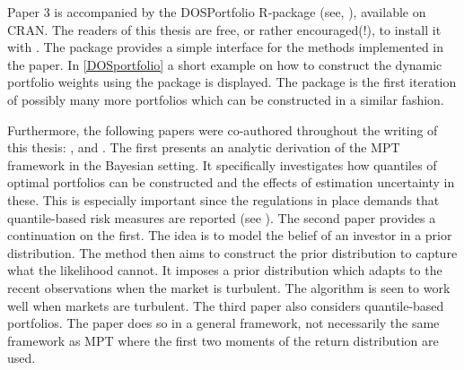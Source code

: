 \documentclass[12pt, oneside]{book}\usepackage{knitr}
\begin{document}
Paper 3 is accompanied by the DOSPortfolio R-package (see, \citet{DOSPortfolio}), available on CRAN. 
The readers of this thesis are free, or rather encouraged(!), to install it with \hlstd{(}\hlstd{)}. 
The package provides a simple interface for the methods implemented in the paper. 
In \ref{DOSportfolio} a short example on how to construct the dynamic portfolio weights using the package is displayed. 
The package is the first iteration of possibly many more portfolios which can be constructed in a similar fashion.
\begin{knitrout}\small
{}\color{fgcolor}
\end{knitrout}
Furthermore, the following papers were co-authored throughout the writing of this thesis: \cite{bodnar2020quantile}, \cite{bodnar2021bayesian}  and \cite{bodnar2021quantile}.
The first presents an analytic derivation of the MPT framework in the Bayesian setting. 
It specifically investigates how quantiles of optimal portfolios can be constructed and the effects of estimation uncertainty in these. 
This is especially important since the regulations in place demands that quantile-based risk measures are reported (see \citet{basel4}).
The second paper provides a continuation on the first. 
The idea is to model the belief of an investor in a prior distribution. 
The method then aims to construct the prior distribution to capture what the likelihood cannot. 
It imposes a prior distribution which adapts to the recent observations when the market is turbulent. 
The algorithm is seen to work well when markets are turbulent.
The third paper also considers quantile-based portfolios. 
The paper does so in a general framework, not necessarily the same framework as MPT where the first two moments of the return distribution are used.
\end{document}
